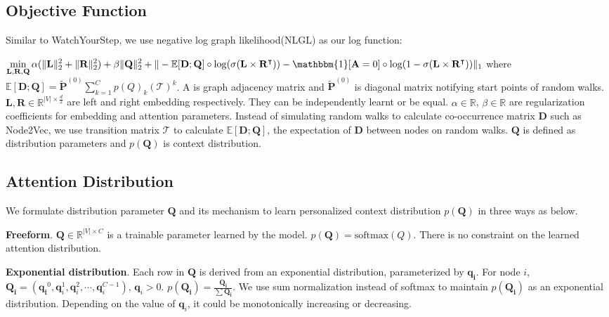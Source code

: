 \documentclass{article}
\begin{document}
\subsection{Objective Function}
Similar to WatchYourStep, we use negative log graph likelihood(NLGL) as our log function:

$\displaystyle\min_{\mathbf{L},\mathbf{R},\mathbf{Q}}\alpha(\|\mathbf{L}\|_2^2 + \|\mathbf{R}\|_2^2 ) + \beta\|\mathbf{Q}\|_2^2 +\|-\mathbb{E}[\mathbf{D};\mathbf{Q}]\circ\log(\sigma(\mathbf{L}\times\mathbf{R}^\intercal)) -\mathbbm{1}[\mathbf{A}=0]\circ\log(1-\sigma(\mathbf{L}\times\mathbf{R}^\intercal)) \|_1$
where $\mathbb{E}[\mathbf{D};\mathbf{Q}] = \tilde{\mathbf{P}}^{(0)}\displaystyle\sum_{k=1}^{C}p(Q)_k(\mathcal{T})^k$. A is graph adjacency matrix and $\tilde{\mathbf{P}}^{(0)}$ is diagonal matrix notifying start points of random walks. $\mathbf{L}, \mathbf{R} \in \mathbb{R}^{|V|\times \frac{d}{2}}$ are left and right embedding respectively. They can be independently learnt or be equal. $\alpha \in \mathbb{R}$, $\beta \in \mathbb{R}$ are regularization coefficients for embedding and attention parameters. Instead of simulating random walks to calculate co-occurrence matrix $\mathbf{D}$ such as Node2Vec, we use transition matrix $\mathcal{T}$ to calculate $\mathbb{E}[\mathbf{D};\mathbf{Q}]$, the expectation of $\mathbf{D}$ between nodes on random walks. $\mathbf{Q}$ is defined as distribution parameters and $p(\mathbf{Q})$ is context distribution. 

\subsection{Attention Distribution}
We formulate distribution parameter $\mathbf{Q}$ and its mechanism to learn personalized context distribution $p(\mathbf{Q})$ in three ways as below.

\textbf{Freeform}.
$\mathbf{Q} \in \mathbb{R}^{|V|\times{C}}$ is a trainable parameter learned by the model. $p(\mathbf{Q}) = \text{softmax}(Q)$. There is no constraint on the learned attention distribution.

\textbf{Exponential distribution}.
Each row in $\mathbf{Q}$ is derived from an exponential distribution, parameterized by $\mathbf{q_i}$. For node $i$, $\mathbf{Q_i} = (\mathbf{q_i}^0, \mathbf{q}_i^1, \mathbf{q}_i^2, \cdots, \mathbf{q}_i^{C-1})$, $\mathbf{q}_i>0$. $p(\mathbf{Q_i}) = \frac{\mathbf{Q_i}}{\sum \mathbf{Q_i}}$. We use sum normalization instead of softmax to maintain $p(\mathbf{Q_i})$ as an exponential distribution. Depending on the value of $\mathbf{q}_i$, it could be monotonically increasing or decreasing.
\end{document}
